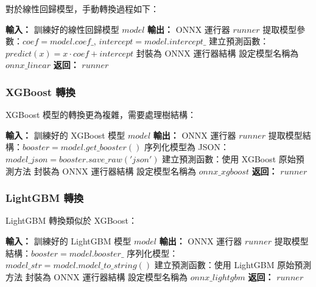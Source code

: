 \documentclass[11pt,a4paper]{article}
\begin{document}
對於線性回歸模型，手動轉換過程如下：

\begin{algorithm}
\caption{線性回歸手動 ONNX 轉換}
\begin{algorithmic}[1]
\STATE \textbf{輸入：} 訓練好的線性回歸模型 $model$
\STATE \textbf{輸出：} ONNX 運行器 $runner$
\STATE
\STATE 提取模型參數：$coef = model.coef\_$, $intercept = model.intercept\_$
\STATE 建立預測函數：$predict(x) = x \cdot coef + intercept$
\STATE 封裝為 ONNX 運行器結構
\STATE 設定模型名稱為 $onnx\_linear$
\STATE \textbf{返回：} $runner$
\end{algorithmic}
\end{algorithm}

\subsubsection{XGBoost 轉換}

XGBoost 模型的轉換更為複雜，需要處理樹結構：

\begin{algorithm}
\caption{XGBoost 手動 ONNX 轉換}
\begin{algorithmic}[1]
\STATE \textbf{輸入：} 訓練好的 XGBoost 模型 $model$
\STATE \textbf{輸出：} ONNX 運行器 $runner$
\STATE
\STATE 提取模型結構：$booster = model.get\_booster()$
\STATE 序列化模型為 JSON：$model\_json = booster.save\_raw('json')$
\STATE 建立預測函數：使用 XGBoost 原始預測方法
\STATE 封裝為 ONNX 運行器結構
\STATE 設定模型名稱為 $onnx\_xgboost$
\STATE \textbf{返回：} $runner$
\end{algorithmic}
\end{algorithm}

\subsubsection{LightGBM 轉換}

LightGBM 轉換類似於 XGBoost：

\begin{algorithm}
\caption{LightGBM 手動 ONNX 轉換}
\begin{algorithmic}[1]
\STATE \textbf{輸入：} 訓練好的 LightGBM 模型 $model$
\STATE \textbf{輸出：} ONNX 運行器 $runner$
\STATE
\STATE 提取模型結構：$booster = model.booster\_$
\STATE 序列化模型：$model\_str = model.model\_to\_string()$
\STATE 建立預測函數：使用 LightGBM 原始預測方法
\STATE 封裝為 ONNX 運行器結構
\STATE 設定模型名稱為 $onnx\_lightgbm$
\STATE \textbf{返回：} $runner$
\end{algorithmic}
\end{algorithm}
\end{document}
